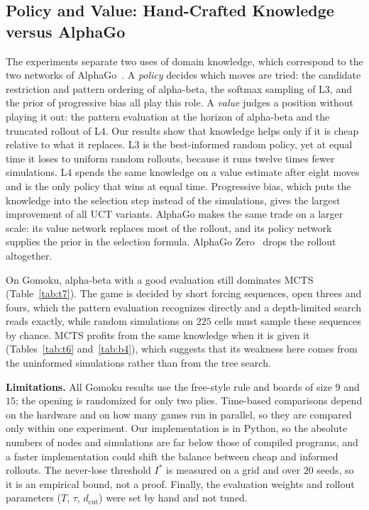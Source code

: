 \subsection{Policy and Value: Hand-Crafted Knowledge versus AlphaGo}
\label{subsec:discussion_policy_value}

The experiments separate two uses of domain knowledge, which correspond to the two networks of AlphaGo~\cite{silver2016mastering}. A \emph{policy} decides which moves are tried: the candidate restriction and pattern ordering of alpha-beta, the softmax sampling of L3, and the prior of progressive bias all play this role. A \emph{value} judges a position without playing it out: the pattern evaluation at the horizon of alpha-beta and the truncated rollout of L4. Our results show that knowledge helps only if it is cheap relative to what it replaces. L3 is the best-informed random policy, yet at equal time it loses to uniform random rollouts, because it runs twelve times fewer simulations. L4 spends the same knowledge on a value estimate after eight moves and is the only policy that wins at equal time. Progressive bias, which puts the knowledge into the selection step instead of the simulations, gives the largest improvement of all UCT variants. AlphaGo makes the same trade on a larger scale: its value network replaces most of the rollout, and its policy network supplies the prior in the selection formula. AlphaGo Zero~\cite{silver2017mastering} drops the rollout altogether.

On Gomoku, alpha-beta with a good evaluation still dominates MCTS (Table~\ref{tab:t7}). The game is decided by short forcing sequences, open threes and fours, which the pattern evaluation recognizes directly and a depth-limited search reads exactly, while random simulations on $225$ cells must sample these sequences by chance. MCTS profits from the same knowledge when it is given it (Tables~\ref{tab:t6} and~\ref{tab:b4}), which suggests that its weakness here comes from the uninformed simulations rather than from the tree search.

\textbf{Limitations.} All Gomoku results use the free-style rule and boards of size $9$ and $15$; the opening is randomized for only two plies. Time-based comparisons depend on the hardware and on how many games run in parallel, so they are compared only within one experiment. Our implementation is in Python, so the absolute numbers of nodes and simulations are far below those of compiled programs, and a faster implementation could shift the balance between cheap and informed rollouts. The never-lose threshold $I^{*}$ is measured on a grid and over $20$ seeds, so it is an empirical bound, not a proof. Finally, the evaluation weights and rollout parameters ($T$, $\tau$, $d_{\mathrm{cut}}$) were set by hand and not tuned.
